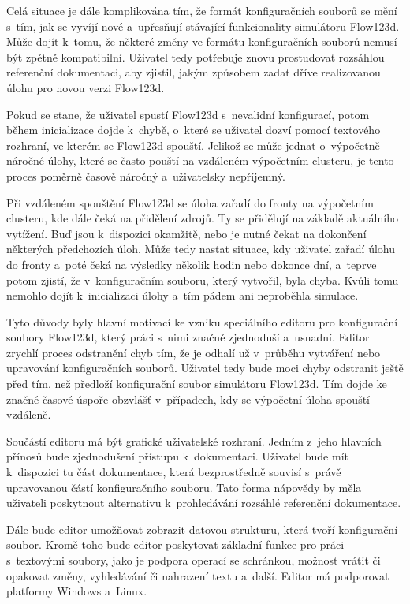 \documentclass[FM,bw,DP]{tulthesis}
\begin{document}
Celá situace je dále komplikována tím, že formát konfiguračních souborů se mění s~tím, jak se vyvíjí nové a~upřesňují stávající funkcionality simulátoru Flow123d. Může dojít k~tomu, že některé změny ve formátu konfiguračních souborů nemusí být zpětně kompatibilní. Uživatel tedy potřebuje znovu prostudovat rozsáhlou referenční dokumentaci, aby zjistil, jakým způsobem zadat dříve realizovanou úlohu pro novou verzi Flow123d.

Pokud se stane, že uživatel spustí Flow123d s~nevalidní konfigurací, potom během inicializace dojde k~chybě, o~které se uživatel dozví pomocí textového rozhraní, ve kterém se Flow123d spouští. Jelikož se může jednat o~výpočetně náročné úlohy, které se často pouští na vzdáleném výpočetním clusteru, je tento proces poměrně časově náročný a~uživatelsky nepříjemný.

Při vzdáleném spouštění Flow123d se úloha zařadí do fronty na výpočetním clusteru, kde dále čeká na přidělení zdrojů. Ty se přidělují na základě aktuálního vytížení. Buď jsou k~dispozici okamžitě, nebo je nutné čekat na dokončení některých předchozích úloh. Může tedy nastat situace, kdy uživatel zařadí úlohu do fronty a~poté čeká na výsledky několik hodin nebo dokonce dní, a~teprve potom zjistí, že v~konfiguračním souboru, který vytvořil, byla chyba. Kvůli tomu nemohlo dojít k~inicializaci úlohy a~tím pádem ani neproběhla simulace.

Tyto důvody byly hlavní motivací ke vzniku speciálního editoru pro konfigurační soubory Flow123d, který práci s~nimi značně zjednoduší a~usnadní. Editor zrychlí proces odstranění chyb tím, že je odhalí už v~průběhu vytváření nebo upravování konfiguračních souborů. Uživatel tedy bude moci chyby odstranit ještě před tím, než předloží konfigurační soubor simulátoru Flow123d. Tím dojde ke značné časové úspoře obzvlášť v~případech, kdy se výpočetní úloha spouští vzdáleně.

Součástí editoru má být grafické uživatelské rozhraní. Jedním z~jeho hlavních přínosů bude zjednodušení přístupu k~dokumentaci. Uživatel bude mít k~dispozici tu část dokumentace, která bezprostředně souvisí s~právě upravovanou částí konfiguračního souboru. Tato forma nápovědy by měla uživateli poskytnout alternativu k~prohledávání rozsáhlé referenční dokumentace.

Dále bude editor umožňovat zobrazit datovou strukturu, která tvoří konfigurační soubor. Kromě toho bude editor poskytovat základní funkce pro práci s~textovými soubory, jako je podpora operací se schránkou, možnost vrátit či opakovat změny, vyhledávání či nahrazení textu a~další. Editor má podporovat platformy Windows a~Linux.
\end{document}
